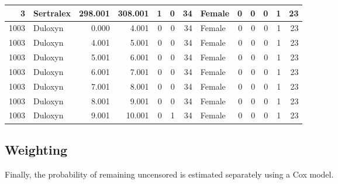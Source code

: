\documentclass[
]{book}
\begin{document}
\begin{table}
\begin{tabular}[t]{r|l|r|r|r|r|r|l|r|r|r|r|r}
\hline
3 & Sertralex & 298.001 & 308.001 & 1 & 0 & 34 & Female & 0 & 0 & 0 & 1 & 23\\
\hline
1003 & Duloxyn & 0.000 & 4.001 & 0 & 0 & 34 & Female & 0 & 0 & 0 & 1 & 23\\
\hline
1003 & Duloxyn & 4.001 & 5.001 & 0 & 0 & 34 & Female & 0 & 0 & 0 & 1 & 23\\
\hline
1003 & Duloxyn & 5.001 & 6.001 & 0 & 0 & 34 & Female & 0 & 0 & 0 & 1 & 23\\
\hline
1003 & Duloxyn & 6.001 & 7.001 & 0 & 0 & 34 & Female & 0 & 0 & 0 & 1 & 23\\
\hline
1003 & Duloxyn & 7.001 & 8.001 & 0 & 0 & 34 & Female & 0 & 0 & 0 & 1 & 23\\
\hline
1003 & Duloxyn & 8.001 & 9.001 & 0 & 0 & 34 & Female & 0 & 0 & 0 & 1 & 23\\
\hline
1003 & Duloxyn & 9.001 & 10.001 & 0 & 1 & 34 & Female & 0 & 0 & 0 & 1 & 23\\
\hline
\end{tabular}
\endgroup{}
\end{table}

\subsection{Weighting}\label{weighting}

Finally, the probability of remaining uncensored is estimated separately
using a Cox model.
\end{document}
